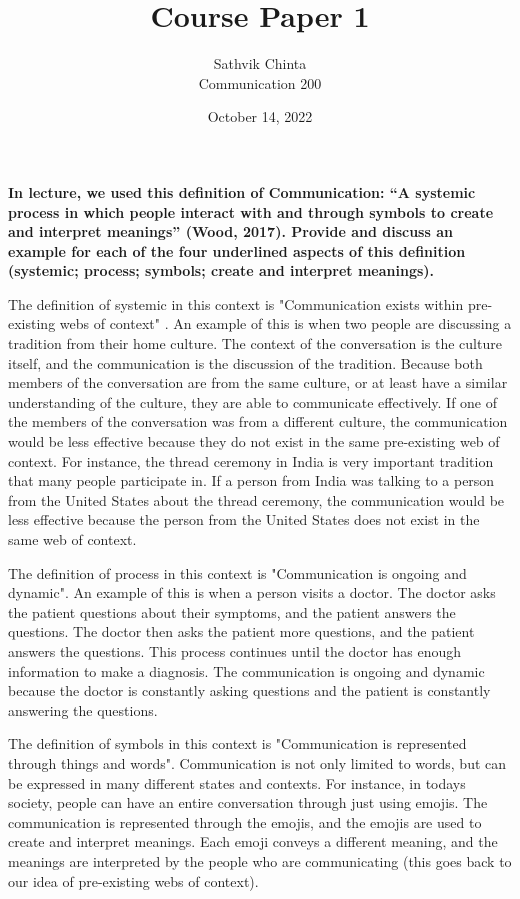\documentclass[a4paper]{article}
\title {
	Course Paper 1
}
\author {
	\normalsize Sathvik Chinta\\\normalsize
    \normalsize Communication 200\\\normalsize
}
\date {
	\color{black} October 14, 2022
}
\begin{document}
 \maketitle

    \section{}
        \textbf{In lecture, we used this definition of Communication: “A systemic process in which people interact with and through symbols to create and interpret meanings” (Wood, 2017). Provide and discuss an example for each of the four underlined aspects of this definition (systemic; process; symbols; create and interpret meanings).}

		The definition of systemic in this context is "Communication exists within pre-existing webs of context" \cite{wood2017}. An example of this
        is when two people are discussing a tradition from their home culture. The context of the conversation is the culture itself, 
        and the communication is the discussion of the tradition. Because both members of the conversation are from the same culture,
        or at least have a similar understanding of the culture, they are able to communicate effectively. If one of the members of the
        conversation was from a different culture, the communication would be less effective because they do not exist in the same
        pre-existing web of context. For instance, the thread ceremony in India is very important tradition that many 
        people participate in. If a person from India was talking to a person from the United States about the thread ceremony,
        the communication would be less effective because the person from the United States does not exist in the same web of context.

        The definition of process in this context is "Communication is ongoing and dynamic". An example of this is when a person 
        visits a doctor. The doctor asks the patient questions about their symptoms, and the patient answers the questions. The doctor
        then asks the patient more questions, and the patient answers the questions. This process continues until the doctor has enough
        information to make a diagnosis. The communication is ongoing and dynamic because the doctor is constantly asking questions
        and the patient is constantly answering the questions. 

        The definition of symbols in this context is "Communication is represented through things and words". Communication is not 
        only limited to words, but can be expressed in many different states and contexts. For instance, in todays society, people
        can have an entire conversation through just using emojis. The communication is represented through the emojis, and the
        emojis are used to create and interpret meanings. Each emoji conveys a different meaning, and the meanings are interpreted
        by the people who are communicating (this goes back to our idea of pre-existing webs of context). 
        
\end{document}
